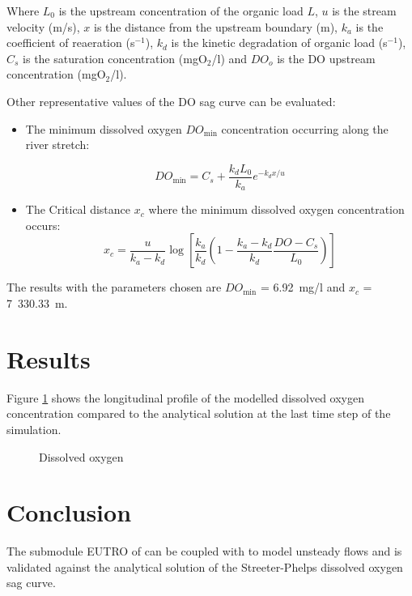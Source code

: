 Where $L_0$ is the upstream concentration of the organic load $L$,
$u$ is the stream velocity (m/s), $x$ is the distance from the upstream boundary
(m), $k_a$ is the coefficient of reaeration (s$^{-1}$), $k_d$ is the kinetic
degradation of organic load (s$^{-1}$),
$C_s$ is the saturation concentration (mgO$_2$/l) and $DO_o$ is the DO upstream
concentration (mgO$_2$/l).

Other representative values of the DO sag curve can be evaluated:

\begin{itemize}
\item The minimum dissolved oxygen $DO_{\textrm{min}}$ concentration occurring
along the river stretch:
 
$$DO_{\textrm{min}} = C_s + \frac{k_d L_0}{k_a} e^{-k_d x /u }$$
 
\item The Critical distance $x_c$ where the minimum dissolved oxygen
concentration occurs:
 $$x_c = \frac{u}{k_a - k_d} \log \left[ \frac{k_a} {k_d}
 \left( 1-\frac{k_a - k_d}{k_d} \frac{DO - C_s} {L_0} \right)\right] $$
\end{itemize}

The results with the parameters chosen are $DO_{\textrm{min}}$ = 6.92~mg/l and
$x_c$ = 7~330.33~m.

\section{Results}

Figure \ref{fig:waq2d_eutro_streeter_phelps:res} shows the longitudinal profile
of the modelled dissolved oxygen concentration compared to the analytical
solution at the last time step of the simulation.

\begin{figure} [H]
\centering
{}
 \caption{Dissolved oxygen}
 \label{fig:waq2d_eutro_streeter_phelps:res}
\end{figure}

\section{Conclusion}

The submodule EUTRO of \waqtel can be coupled with  to model
unsteady flows and is validated against the analytical solution of the
Streeter-Phelps dissolved oxygen sag curve.
